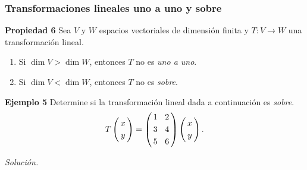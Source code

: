 \begin{frame}\frametitle{Transformaciones lineales uno a uno y sobre}

\begin{prop}{\textbf{Propiedad 6}}
	\justifying
	Sea $V$ y $W$ espacios vectoriales de dimensión finita y $T:V\to W$ una transformación lineal. 
	\begin{enumerate}
		\item[\labelname{$a$}] Si $\dim V > \dim W$, entonces $T$ no es \textit{uno a uno}.
		\item[\labelname{$b$}] Si $\dim V < \dim W$, entonces $T$ no es \textit{sobre}.
	\end{enumerate}
\end{prop}	

\begin{ej}{\textbf{Ejemplo 5}}
	\justifying
	Determine si la transformación lineal dada a continuación es \textit{sobre}.
	\[
	T
	\left(
	\begin{array}{@{\hspace{0.3\tabcolsep}}c@{\hspace{0.3\tabcolsep}}}
	x  \\[1mm]
	y  
	\end{array}
	\right)
	=
	\left(
	\begin{array}{@{\hspace{0.3\tabcolsep}}r@{\hspace{1.5\tabcolsep}}r@{\hspace{0.3\tabcolsep}}}
	1 & 2  \\[1mm]
	3 & 4  \\[1mm]
	5 & 6 
	\end{array}
	\right)
	\left(
	\begin{array}{@{\hspace{0.3\tabcolsep}}c@{\hspace{0.3\tabcolsep}}}
	x  \\[1mm]
	y  
	\end{array}
	\right).
	\]
\end{ej}
\textit{Solución.}

\end{frame}


\subsection{}

